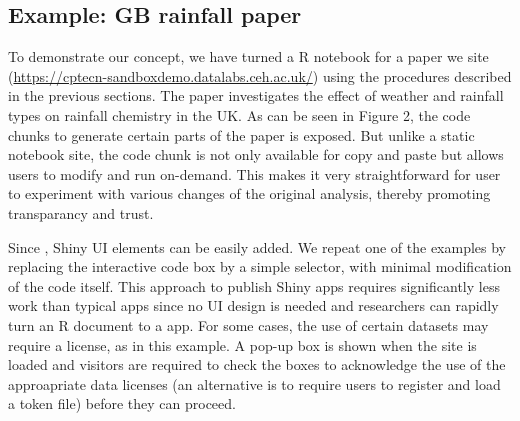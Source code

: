 \hypertarget{example-gb-rainfall-paper}{%
\subsection{Example: GB rainfall
paper}\label{example-gb-rainfall-paper}}

To demonstrate our concept, we have turned a R \DIFdelbegin {}\DIFdelend \DIFaddbegin {}\DIFaddend notebook for a
paper we \DIFdelbegin {}\emph{}%
\emph{} %
\DIFdelend \DIFaddbegin {} \DIFaddend site
(\url{https://cptecn-sandboxdemo.datalabs.ceh.ac.uk/}) using the
procedures described in the previous sections. The paper investigates
the effect of weather and rainfall types on rainfall chemistry in the
UK. As can be seen in Figure 2, the code chunks to generate certain
parts of the paper is exposed. But unlike a static notebook site, the
code chunk is not only available for copy and paste but allows users to
modify and run on-demand. This makes it very straightforward for user to
experiment with various changes of the original analysis, thereby
promoting transparancy and trust.

Since \DIFdelbegin \emph{} %
\DIFdelend \DIFaddbegin {} \DIFaddend , Shiny UI elements
can be easily added. We repeat one of the examples by replacing the
interactive code box by a simple selector, with minimal modification of
the code itself. This approach to publish Shiny apps requires
significantly less work than typical \DIFdelbegin {}\DIFdelend \DIFaddbegin {}\DIFaddend apps since no UI design
is needed and researchers can rapidly turn an R \DIFdelbegin {}\DIFdelend \DIFaddbegin {}\DIFaddend document to a \DIFdelbegin {}\DIFdelend \DIFaddbegin {}\DIFaddend app. For some cases, the use of certain datasets may require a
license, as in this example. A pop-up box is shown when the site is
loaded and visitors are required to check the boxes to acknowledge the
use of the approapriate data licenses (an alternative is to require
users to register and load a token file) before they can proceed.

